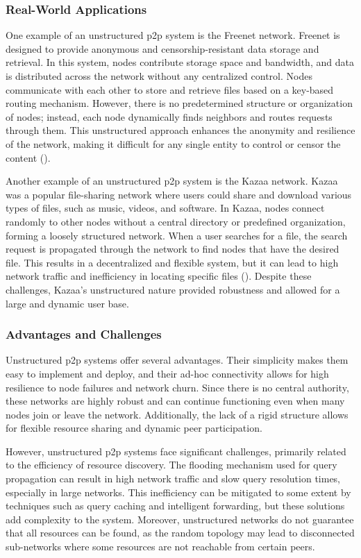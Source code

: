 \subsubsection*{Real-World Applications}
One example of an unstructured \gls{p2p} system is the Freenet network.
Freenet is designed to provide anonymous and censorship-resistant data storage and retrieval.
In this system, nodes contribute storage space and bandwidth, and data is distributed across the network without any centralized control.
Nodes communicate with each other to store and retrieve files based on a key-based routing mechanism.
However, there is no predetermined structure or organization of nodes; instead, each node dynamically finds neighbors and routes requests through them.
This unstructured approach enhances the anonymity and resilience of the network, making it difficult for any single entity to control or censor the content (\cite{Clarke2001}).

Another example of an unstructured \gls{p2p} system is the Kazaa network.
Kazaa was a popular file-sharing network where users could share and download various types of files, such as music, videos, and software.
In Kazaa, nodes connect randomly to other nodes without a central directory or predefined organization, forming a loosely structured network.
When a user searches for a file, the search request is propagated through the network to find nodes that have the desired file.
This results in a decentralized and flexible system, but it can lead to high network traffic and inefficiency in locating specific files (\cite{liang2005kazaa}).
Despite these challenges, Kazaa's unstructured nature provided robustness and allowed for a large and dynamic user base.


\subsubsection*{Advantages and Challenges}
Unstructured \gls{p2p} systems offer several advantages.
Their simplicity makes them easy to implement and deploy, and their ad-hoc connectivity allows for high resilience to node failures and network churn.
Since there is no central authority, these networks are highly robust and can continue functioning even when many nodes join or leave the network.
Additionally, the lack of a rigid structure allows for flexible resource sharing and dynamic peer participation.

However, unstructured \gls{p2p} systems face significant challenges, primarily related to the efficiency of resource discovery.
The flooding mechanism used for query propagation can result in high network traffic and slow query resolution times, especially in large networks.
This inefficiency can be mitigated to some extent by techniques such as query caching and intelligent forwarding, but these solutions add complexity to the system.
Moreover, unstructured networks do not guarantee that all resources can be found, as the random topology may lead to disconnected sub-networks where some resources are not reachable from certain peers.

